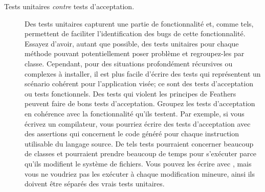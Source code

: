 \documentclass[a4paper,10pt,twoside]{book}
\begin{document}
{\begin{description}
 
\item[Tests unitaires \textit{contre} tests d'acceptation.]
Des tests unitaires capturent une partie de fonctionnalité et, comme tels, permettent de faciliter l'identification des bugs de cette fonctionnalité. Essayez d'avoir, autant que possible, des tests unitaires pour chaque méthode pouvant potentiellement poser problème et regroupez-les par classe. Cependant, pour des situations profondément récursives ou complexes à installer, il est plus facile d'écrire des tests qui représentent un scénario cohérent pour l'application visée; ce sont des tests d'acceptation ou tests fonctionnels.
Des tests qui violent les principes de  Feathers peuvent faire de bons tests d'acceptation.
Groupez les tests d'acceptation en cohérence avec la fonctionnalité qu'ils testent.
Par exemple, si vous écrivez un compilateur, vous pourriez écrire des tests d'acceptation avec des assertions qui concernent le code généré pour chaque instruction utilisable du langage source.
De tels tests pourraient concerner beaucoup de classes et pourraient prendre beaucoup de temps pour s'exécuter parce qu'ils modifient le système de fichiers.
Vous pouvez les écrire avec \sunit, mais vous ne voudriez pas les exécuter à chaque modification mineure, ainsi ils doivent être séparés des vrais tests unitaires.

\end{description}}
\end{document}
